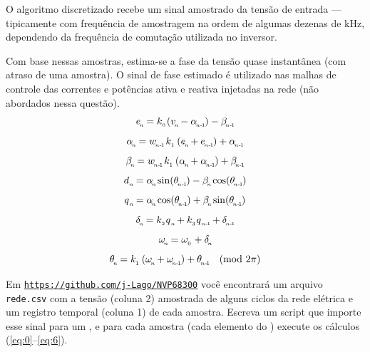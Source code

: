O algoritmo discretizado recebe um sinal amostrado da tensão de entrada --- tipicamente com frequência de amostragem
na ordem de algumas dezenas de kHz, dependendo da frequência de comutação utilizada no inversor.

Com base nessas amostras, estima-se a fase da tensão quase instantânea (com atraso de uma amostra).
O sinal de fase estimado é utilizado nas malhas de controle das correntes e potências ativa e reativa injetadas na rede
(não abordados nessa questão).
\begin{equation}\label{eq:0}
        e\0 = k_{_0\!} \left( v\0 - \alpha\1 \right)  - \beta\1
\end{equation}
\begin{equation}\label{eq:1}
    \alpha\0 = w\1  \, k_{_1}  \left( e\0 + e\1 \right)  + \alpha\1
\end{equation}
\begin{equation}\label{eq:2}
    \beta\0 = w\1  \, k_{_1}  \left( \alpha\0 + \alpha\1 \right)  + \beta\1
\end{equation}
\begin{equation}\label{eq:3a}
    d{_{_{ n\!}}} =  \alpha\0 \sin(\theta\1) - \beta\0  \cos(\theta\1)
\end{equation}
\begin{equation}\label{eq:3b}
    q{_{_{ n\!}}} =  \alpha\0 \cos(\theta\1) + \beta\0  \sin(\theta\1)
\end{equation}
\begin{equation}\label{eq:4}
    \delta\0 = k_{_2} q{_{_{ n\!}}} + k_{_3} q{_{_{ n\text{-}\!\>\!1\!}}} + \delta\1
\end{equation}
\begin{equation}\label{eq:5}
    \omega_{_{\! n\!}}  = \omega_{_0} + \delta_{_{\! n\!}}
\end{equation}
\begin{equation}\label{eq:6}
    \theta\0 = k_{_1}  \left( \omega\0 + \omega\1 \right)  + \theta\1    \ \ \  (\text{mod}~2\pi)
\end{equation}


Em \texttt{\url{https://github.com/j-Lago/NVP68300}} você encontrará um arquivo \texttt{rede.csv} com a tensão (coluna 2) amostrada de alguns
ciclos da rede elétrica e um registro temporal (coluna 1) de cada amostra.
Escreva um script que importe esse sinal para um , e para cada amostra (cada elemento do )
execute os cálculos (\ref{eq:0}--\ref{eq:6}).

